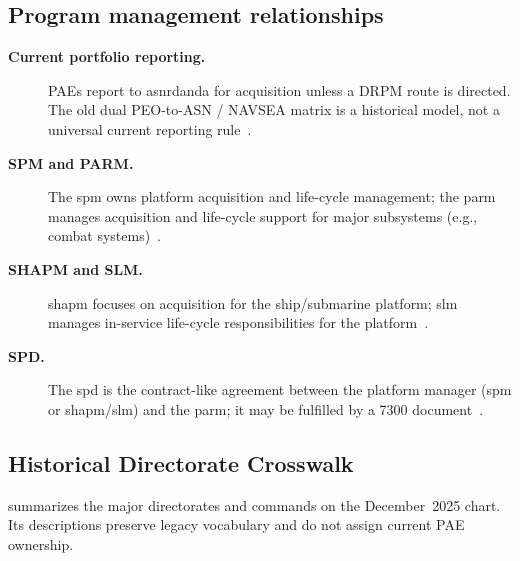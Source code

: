 \documentclass[../main.tex]{subfiles}
\begin{document}
\subsection{Program management relationships}
\begin{description}
  \item[\textbf{Current portfolio reporting.}] PAEs report to \ac{asnrdanda} for acquisition unless a DRPM route is directed. The old dual PEO-to-ASN / NAVSEA matrix is a historical model, not a universal current reporting rule~\autocite{edo-2-1-2-navsea-organization-2025,DON-DRPM-RAS-Aug2026}.
  \item[\textbf{SPM and PARM.}] The \ac{spm} owns platform acquisition and life-cycle management; the \ac{parm} manages acquisition and life-cycle support for major subsystems (e.g., combat systems)~\autocite{edo-2-1-2-navsea-organization-2025}.
  \item[\textbf{SHAPM and SLM.}] \ac{shapm} focuses on acquisition for the ship/submarine platform; \ac{slm} manages in-service life-cycle responsibilities for the platform~\autocite{edo-2-1-2-navsea-organization-2025}.
  \item[\textbf{SPD.}] The \ac{spd} is the contract-like agreement between the platform manager (\ac{spm} or \ac{shapm}/\ac{slm}) and the \ac{parm}; it may be fulfilled by a 7300 document~\autocite{edo-2-1-2-navsea-organization-2025}.
\end{description}

\subsection{Historical Directorate Crosswalk}
\Tab{\ref{tab:navsea-directorates}} summarizes the major directorates and commands on the December~2025 chart. Its descriptions preserve legacy vocabulary and do not assign current PAE ownership.
\end{document}
